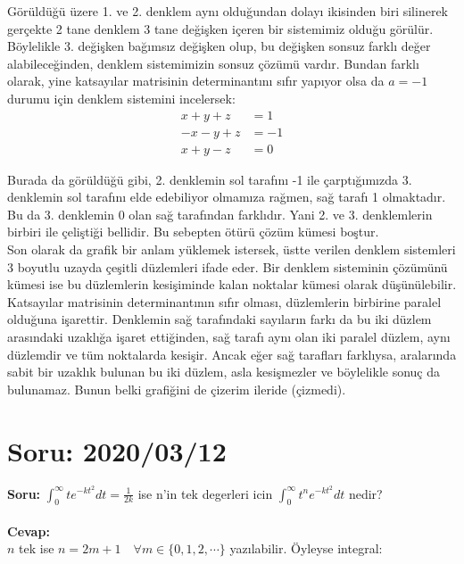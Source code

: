 \documentclass{article}
\begin{document}
Görüldüğü üzere 1. ve 2. denklem aynı olduğundan dolayı ikisinden biri silinerek gerçekte 2 tane denklem 3 tane değişken içeren bir sistemimiz olduğu görülür. Böylelikle 3. değişken bağımsız değişken olup, bu değişken sonsuz farklı değer alabileceğinden, denklem sistemimizin sonsuz çözümü vardır. Bundan farklı olarak, yine katsayılar matrisinin determinantını sıfır yapıyor olsa da $a=-1$ durumu için denklem sistemini incelersek:
%
$$
\begin{array}{ll}
x + y + z &= 1\\
-x - y + z &=-1 \\
x + y -z &= 0 
\end{array}
$$

Burada da görüldüğü gibi, 2. denklemin sol tarafını -1 ile  çarptığımızda 3. denklemin sol tarafını elde edebiliyor olmamıza rağmen, sağ tarafı 1 olmaktadır. Bu da 3. denklemin 0 olan sağ tarafından farklıdır. Yani 2. ve 3. denklemlerin birbiri ile çeliştiği bellidir. Bu sebepten ötürü çözüm kümesi boştur. \\

Son olarak da grafik bir anlam yüklemek istersek, üstte verilen denklem sistemleri 3 boyutlu uzayda çeşitli düzlemleri ifade eder. Bir denklem sisteminin çözümünü kümesi ise bu düzlemlerin kesişiminde kalan noktalar kümesi olarak düşünülebilir. Katsayılar matrisinin determinantının sıfır olması, düzlemlerin birbirine paralel olduğuna işarettir. Denklemin sağ tarafındaki sayıların farkı da bu iki düzlem arasındaki uzaklığa işaret ettiğinden, sağ tarafı aynı olan iki paralel düzlem, aynı düzlemdir ve tüm noktalarda kesişir. Ancak eğer sağ tarafları farklıysa, aralarında sabit bir uzaklık bulunan bu iki düzlem, asla kesişmezler ve böylelikle sonuç da bulunamaz. Bunun belki grafiğini de çizerim ileride (çizmedi).
 






\section{Soru: 2020/03/12}
\textbf{Soru:} $\int_0^\infty te^{-kt^2}dt = \frac{1}{2k}$ ise n'in tek degerleri icin $\int_0^\infty t^ne^{-kt^2}dt$ nedir?
\\ \\
\textbf{Cevap: }\\

$n$ tek ise $n = 2m+1 \quad \forall m \in \{0,1,2,\cdots \}$ yazılabilir. Öyleyse integral: 
\end{document}
